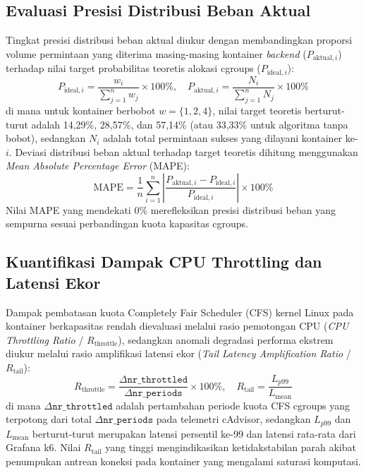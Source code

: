 \subsection{Evaluasi Presisi Distribusi Beban Aktual}
Tingkat presisi distribusi beban aktual diukur dengan membandingkan proporsi volume permintaan yang diterima masing-masing kontainer \textit{backend} ($P_{\text{aktual}, i}$) terhadap nilai target probabilitas teoretis alokasi cgroups ($P_{\text{ideal}, i}$):
\begin{equation}
    P_{\text{ideal}, i} = \frac{w_i}{\sum_{j=1}^{n} w_j} \times 100\%, \quad P_{\text{aktual}, i} = \frac{N_i}{\sum_{j=1}^{n} N_j} \times 100\%
    \label{eq:distribusi_beban}
\end{equation}
di mana untuk kontainer berbobot $w = \{1, 2, 4\}$, nilai target teoretis berturut-turut adalah 14,29\%, 28,57\%, dan 57,14\% (atau 33,33\% untuk algoritma tanpa bobot), sedangkan $N_i$ adalah total permintaan sukses yang dilayani kontainer ke-$i$. Deviasi distribusi beban aktual terhadap target teoretis dihitung menggunakan \textit{Mean Absolute Percentage Error} (MAPE):
\begin{equation}
    \text{MAPE} = \frac{1}{n} \sum_{i=1}^{n} \left| \frac{P_{\text{aktual}, i} - P_{\text{ideal}, i}}{P_{\text{ideal}, i}} \right| \times 100\%
    \label{eq:mape}
\end{equation}
Nilai MAPE yang mendekati 0\% merefleksikan presisi distribusi beban yang sempurna sesuai perbandingan kuota kapasitas cgroups.

\subsection{Kuantifikasi Dampak CPU Throttling dan Latensi Ekor}
Dampak pembatasan kuota Completely Fair Scheduler (CFS) kernel Linux pada kontainer berkapasitas rendah dievaluasi melalui rasio pemotongan CPU (\textit{CPU Throttling Ratio} / $R_{\text{throttle}}$), sedangkan anomali degradasi performa ekstrem diukur melalui rasio amplifikasi latensi ekor (\textit{Tail Latency Amplification Ratio} / $R_{\text{tail}}$):
\begin{equation}
    R_{\text{throttle}} = \frac{\Delta \texttt{nr\_throttled}}{\Delta \texttt{nr\_periods}} \times 100\%, \quad R_{\text{tail}} = \frac{L_{p99}}{L_{\text{mean}}}
    \label{eq:throttle_and_tail}
\end{equation}
di mana $\Delta \texttt{nr\_throttled}$ adalah pertambahan periode kuota CFS cgroups yang terpotong dari total $\Delta \texttt{nr\_periods}$ pada telemetri cAdvisor, sedangkan $L_{p99}$ dan $L_{\text{mean}}$ berturut-turut merupakan latensi persentil ke-99 dan latensi rata-rata dari Grafana k6. Nilai $R_{\text{tail}}$ yang tinggi mengindikasikan ketidakstabilan parah akibat penumpukan antrean koneksi pada kontainer yang mengalami saturasi komputasi.

